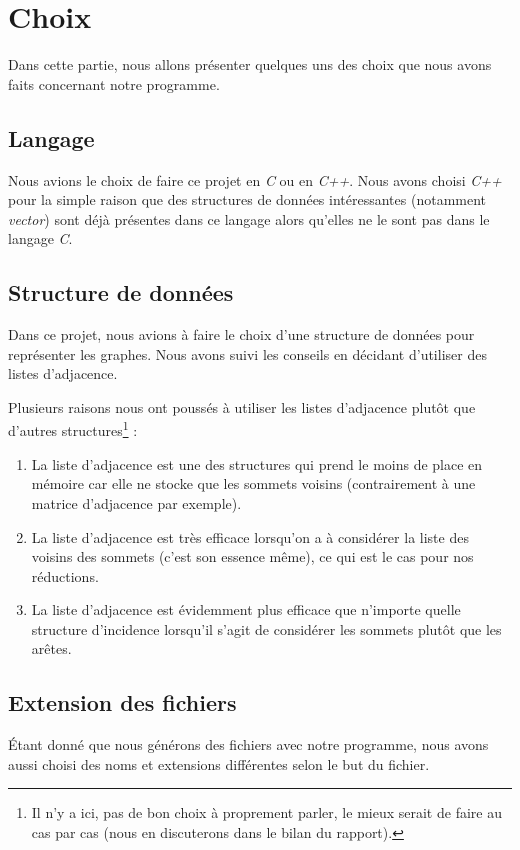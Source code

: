  \section{Choix}
 Dans cette partie, nous allons présenter quelques uns des choix que
 nous avons faits concernant notre programme.

  \subsection{Langage}
  Nous avions le choix de faire ce projet en \emph{C} ou en
  \emph{C++}. Nous avons choisi \emph{C++} pour la simple raison que des
  structures de données intéressantes (notamment \emph{vector}) sont
  déjà présentes dans ce langage alors qu'elles ne le sont pas dans le
  langage \emph{C}.
  
  \subsection{Structure de données}
  Dans ce projet, nous avions à faire le choix d'une structure de
  données pour représenter les graphes. Nous avons suivi les conseils en
  décidant d'utiliser des listes d'adjacence.

  Plusieurs raisons nous ont poussés à utiliser les listes d'adjacence
  plutôt que d'autres structures\footnote{Il n'y a ici, pas de bon choix
  à proprement parler, le mieux serait de faire au cas par cas (nous en
  discuterons dans le bilan du rapport).} :
  \begin{enumerate}
   \item La liste d'adjacence est une des structures qui prend le moins
	 de place en mémoire car elle ne stocke que les sommets voisins
	 (contrairement à une matrice d'adjacence par exemple).
   \item La liste d'adjacence est très efficace lorsqu'on a à
	 considérer la liste des voisins des sommets (c'est son essence
	 même), ce qui est le cas pour nos réductions.
   \item La liste d'adjacence est évidemment plus efficace que n'importe
	 quelle structure d'incidence lorsqu'il s'agit de considérer les
	 sommets plutôt que les arêtes.
  \end{enumerate}

  

  \subsection{Extension des fichiers}
  Étant donné que nous générons des fichiers avec notre programme, nous
  avons aussi choisi des noms et extensions différentes selon le but du
  fichier.

